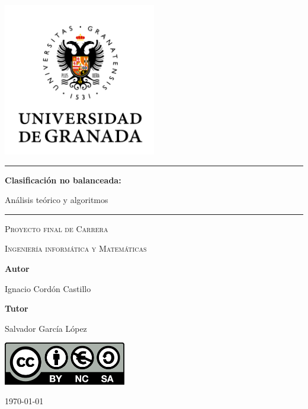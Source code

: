 
\begin{titlepage}
	\centering
	\includegraphics[width=0.5\textwidth]{./imgs/ugr.png}\par
	\vspace{1cm}
        \rule{\textwidth}{0.3em}\hfill
        {\huge\bfseries Clasificación no balanceada: \par
        Análisis teórico y algoritmos \par}
        \rule{\textwidth}{0.3em}\hfill
	\vspace{1cm}
        {\scshape Proyecto final de Carrera\par}
        {\scshape Ingeniería informática y Matemáticas\par}
        \vfill
        {\bf Autor \par}
	{Ignacio Cordón Castillo \par}
	{\bf Tutor \par}
	{Salvador García López \par}
	\vfill
      	\includegraphics[width=0.4\textwidth]{./imgs/by-nc-sa.png}\par
	{\large \today\par}
\end{titlepage}
